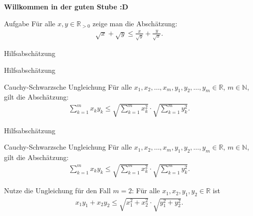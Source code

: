 \documentclass[10pt]{beamer}
\title{}
\author{Artur's Mathematikstübchen}
\date{}
\def\bN{\mathbb{N}}
\def\bR{\mathbb{R}}
\begin{document}

\begin{frame}
    \begin{center}
        \textbf{\huge Willkommen in der guten Stube \newline \newline :D}
    \end{center}
\end{frame}




\begin{frame}
    \begin{alertblock}{Aufgabe}
        Für alle \( x, y \in \bR_{> 0} \) zeige man die Abschätzung:
        \begin{align*}
            \sqrt{x} + \sqrt{y}
            \leq \frac{x}{\sqrt{y}} + \frac{y}{\sqrt{x}}.
        \end{align*}
    \end{alertblock}
\end{frame}



\begin{frame}{Hilfsabschätzung}
    
\end{frame}



\begin{frame}{Hilfsabschätzung}
    \begin{block}{Cauchy-Schwarzsche Ungleichung}
        Für alle \( x_{1}, x_{2}, \ldots, x_{m}, y_{1}, y_{2}, \ldots, y_{m} \in \bR \), \( m \in \bN \), gilt die Abschätzung:
        \begin{align*}
            \sum_{k = 1}^{m} x_{k} y_{k}
            \leq \sqrt{\sum_{k = 1}^{m} x_{k}^{2}} \cdot \sqrt{\sum_{k = 1}^{m} y_{k}^{2}}.
        \end{align*}
    \end{block}
\end{frame}



\begin{frame}{Hilfsabschätzung}
    \begin{block}{Cauchy-Schwarzsche Ungleichung}
        Für alle \( x_{1}, x_{2}, \ldots, x_{m}, y_{1}, y_{2}, \ldots, y_{m} \in \bR \), \( m \in \bN \), gilt die Abschätzung:
        \begin{align*}
            \sum_{k = 1}^{m} x_{k} y_{k}
            \leq \sqrt{\sum_{k = 1}^{m} x_{k}^{2}} \cdot \sqrt{\sum_{k = 1}^{m} y_{k}^{2}}.
        \end{align*}
    \end{block}
    Nutze die Ungleichung für den Fall \( m = 2 \): Für alle \( x_{1}, x_{2}, y_{1}, y_{2} \in \bR \) ist
    \begin{align*}
        x_{1}y_{1} + x_{2}y_{2}
        \leq \sqrt{x_{1}^{2} + x_{2}^{2}} \cdot \sqrt{y_{1}^{2} + y_{2}^{2}}.
    \end{align*}
\end{frame}
\end{document}
